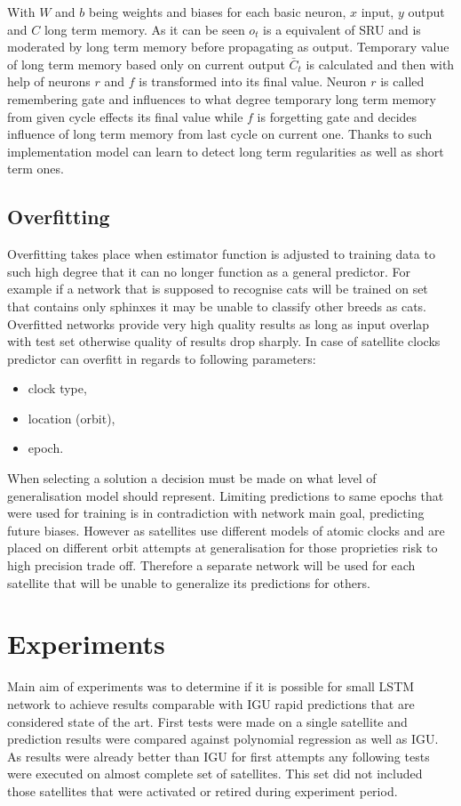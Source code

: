 \documentclass{kybernetika}
\begin{document}
With $W$ and $b$ being weights and biases for each basic neuron, $x$ input, $y$ output and
$C$ long term memory. As it can be seen $o_t$ is a equivalent of SRU and is moderated by
long term memory before propagating as output. Temporary value of long term memory based
only on current output $\bar{C}_t$ is calculated and then with help of neurons $r$ and $f$
is transformed into its final value.
Neuron $r$ is called remembering gate and influences to what degree temporary long term
memory from given cycle effects its final value while $f$ is forgetting gate and
decides influence of long term memory from last cycle on current one.
Thanks to such implementation model can learn to detect long term regularities as well
as short term ones.

\subsection{Overfitting}  
Overfitting takes place when estimator function is adjusted to training data to such high
degree that it can no longer function as a general predictor.
For example if a network that is supposed to recognise cats will be trained on set that contains
only sphinxes it may be unable to classify other breeds as cats.
Overfitted networks provide very high quality results as long as input overlap with test set
otherwise quality of results drop sharply.
In case of satellite clocks predictor can overfitt in regards to following parameters:
\begin{itemize}
\item clock type,
\item location (orbit),
\item epoch.
\end{itemize}
When selecting a solution a decision must be made on what level of generalisation model should
represent. Limiting predictions to same epochs that were used for training is in contradiction
with network main goal, predicting future biases. However as satellites use different models
of atomic clocks and are placed on different orbit attempts at generalisation for those
proprieties risk to high precision trade off.
Therefore a separate network will be used for each satellite that will be unable to generalize
its predictions for others.

\FloatBarrier
\section{Experiments}
Main aim of experiments was to determine if it is possible for small LSTM network to 
achieve results comparable with IGU rapid predictions that are considered state of the art.
First tests were made on a single satellite and prediction results were compared against 
polynomial regression as well as IGU. As results were already better than IGU for first attempts
any following tests were executed on almost complete set of satellites. This set did not included
those satellites that were activated or retired during experiment period.
\end{document}
